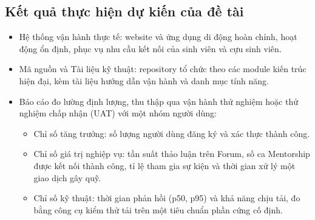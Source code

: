 \documentclass[12pt,a4paper]{article}
\begin{document}
\subsection{Kết quả thực hiện dự kiến của đề tài}
\vspace{-4pt}
\begin{itemize}
    \item Hệ thống vận hành thực tế: website và ứng dụng di động hoàn chỉnh, hoạt động ổn định, phục vụ nhu cầu kết nối của sinh viên và cựu sinh viên.
    \item Mã nguồn và Tài liệu kỹ thuật: repository tổ chức theo các module kiến trúc hiện đại, kèm tài liệu hướng dẫn vận hành và danh mục tính năng.
    \item Báo cáo đo lường định lượng, thu thập qua vận hành thử nghiệm hoặc thử nghiệm chấp nhận (UAT) với một nhóm người dùng:
    \begin{itemize}
        \item Chỉ số tăng trưởng: số lượng người dùng đăng ký và xác thực thành công.
        \item Chỉ số giá trị nghiệp vụ: tần suất thảo luận trên Forum, số ca Mentorship được kết nối thành công, tỉ lệ tham gia sự kiện và thời gian xử lý một giao dịch gây quỹ.
        \item Chỉ số kỹ thuật: thời gian phản hồi (p50, p95) và khả năng chịu tải, đo bằng công cụ kiểm thử tải trên một tiêu chuẩn phần cứng cố định.
    \end{itemize}
\end{itemize}

\end{document}
